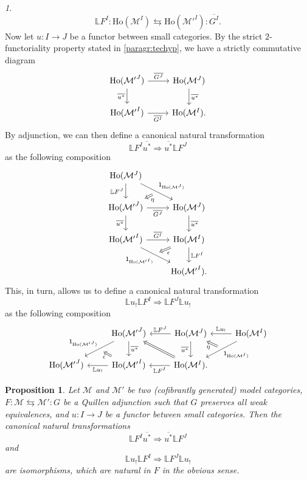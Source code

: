 \documentclass[reqno]{amsart}
\theoremstyle{plain}
\newtheorem{proposition}[subsubsection]{Proposition}
\theoremstyle{definition}
\theoremstyle{remark}
\newtheorem{paragr}[subsubsection]{} %
\newcommand{\M}{\mathcal{M}}
\newcommand{\Unit}[1]{\mathsf{1}_{#1}}%
\newcommand{\fun}[2]{{#2}^{#1}} %
\newcommand{\LL}{\mathbb{L}} %
\newcommand{\Loc}[1]{\mathrm{Ho}(#1)} %
\newcommand{\GZ}[1]{\overline{#1}} %
\newcommand{\nbd}{\nobreakdash} %
\begin{document}
\begin{paragr}
  \[ \LL \fun{I}{F} \colon \Loc{\fun{I}{\M}}\leftrightarrows
    \Loc{\fun{I}{\M'}} \colon \GZ{\fun{I}{G}}.
  \]
Now let $u \colon I \to J$ be a functor between small
categories. By the strict $2$\nbd-functoriality property stated in
\ref{paragr:techyp}, we have a strictly commutative diagram
  \[
    \begin{tikzcd} \Loc{\fun{J}{\M'}} \ar[r,"\GZ{\fun{J}{G}}"] \ar[d,"\GZ{u^*}"']&
\Loc{\fun{J}{\M}} \ar[d,"\GZ{u^*}"]\\ \Loc{\fun{I}{\M'}} \ar[r,"\GZ{\fun{I}{G}}"'] & \Loc{\fun{I}{\M}}.
    \end{tikzcd}
  \]
  By adjunction, we can then define a canonical natural transformation
  \[
     \LL \fun{I}{F}  \GZ{u^*} \Rightarrow \GZ{u^*}  \LL \fun{J}{F}
   \]
   as the following composition
     \[
       \begin{tikzcd}
         \Loc{\fun{J}{\M}}\ar[d,"\LL \fun{J}{F}"']
         \ar[rd,"\Unit{\Loc{\fun{J}{\M}}}",""{name=A,below left}] & \\
         \Loc{\fun{J}{\M'}} \ar[r,"\GZ{\fun{J}{G}}"'] \ar[d,"\GZ{u^*}"']&
\Loc{\fun{J}{\M}} \ar[d,"\GZ{u^*}"]\\ \Loc{\fun{I}{\M'}}
\ar[r,"\GZ{\fun{I}{G}}"]\ar[rd,"\Unit{\Loc{\fun{I}{\M'}}}"',""{name=B,above
right}] & \Loc{\fun{I}{\M}}\ar[d,"\LL \fun{I}{F}"]\\
&\Loc{\fun{I}{\M'}}.
\ar[from=A,to=2-1,Rightarrow,"\eta"]
\ar[from=3-2,to=B,Rightarrow,"\epsilon"]
    \end{tikzcd}
  \]
  This, in turn, allows us to define a canonical natural transformation
  \[
    \LL u_!\LL \fun{I}{F} \Rightarrow \LL \fun{J}{F} \LL u_! 
  \]
  as the following composition
  \[
    \begin{tikzcd}
    &  \Loc{\fun{J}{\M'}}\ar[d,"\GZ{u^*}"]
    \ar[dl,"\Unit{\Loc{\fun{J}{\M'}}}"',""{name=A,below right}]& \Loc{\fun{J}{\M}} \ar[l,"\LL
    \fun{J}{F}"'] \ar[d,"\GZ{u^*}"'] & \Loc{\fun{I}{\M}} \ar[l,"\LL u_!"']
    \ar[dl,"\Unit{\Loc{\fun{I}{\M}}}",""{name=B,above left}]
      \\
    \Loc{\fun{J}{\M'}} & \ar[l,"\LL u_!"]
    \Loc{\fun{I}{\M'}}&\Loc{\fun{I}{\M}}. \ar[l,"\LL \fun{I}{F}"]
    \ar[from=2-2,to=A,Rightarrow,"\epsilon"]
    \ar[from=B,to=1-3,Rightarrow,"\eta"]
    \ar[from=2-3,to=1-2,Rightarrow]
    \end{tikzcd}
  \]  
\end{paragr}
\begin{proposition}\label{prop:htpycocts} Let $\M$ and $\M'$ be two (cofibrantly generated)
  model categories, $F \colon \M \leftrightarrows \M' \colon G$ be a Quillen adjunction such
  that $G$ preserves all weak equivalences, and
  $u \colon I \to J$ be a functor between small categories. Then the
  canonical natural transformations
  \begin{equation}\label{eq:morphder}
     \LL \fun{I}{F}  \GZ{u^*} \Rightarrow \GZ{u^*}  \LL \fun{J}{F}
   \end{equation}
   and
   \begin{equation}\label{eq:cocontinuous}
     \LL u_!\LL \fun{I}{F} \Rightarrow \LL \fun{J}{F} \LL u_! 
   \end{equation}
   are isomorphisms, which are natural in $F$ in the obvious sense.
\end{proposition}
\end{document}
